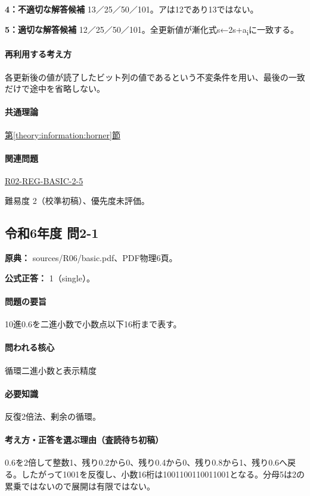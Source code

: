 \noindent\textbf{4：不適切な解答候補} 13／25／50／101。アは12であり13ではない。\par

\noindent\textbf{5：適切な解答候補} 12／25／50／101。全更新値が漸化式s←2s+a\textsubscript{i}に一致する。\par

\paragraph{再利用する考え方} 各更新後の値が読了したビット列の値であるという不変条件を用い、最後の一致だけで途中を省略しない。

\paragraph{共通理論} \hyperref[theory:information:horner]{第\ref*{theory:information:horner}節}

\paragraph{関連問題} \hyperref[q:r02-reg-basic-2-5]{R02-REG-BASIC-2-5}

\par 難易度 2（校準初稿）、優先度未評価。

\subsection{令和6年度 問2-1}
\label{q:r06-reg-basic-2-1}

\noindent\textbf{原典：} sources/R06/basic.pdf、PDF物理6頁。

\textbf{公式正答：} 1（single）。

\paragraph{問題の要旨} 10進0.6を二進小数で小数点以下16桁まで表す。

\paragraph{問われる核心} 循環二進小数と表示精度

\paragraph{必要知識} 反復2倍法、剰余の循環。

\paragraph{考え方・正答を選ぶ理由（査読待ち初稿）} 0.6を2倍して整数1、残り0.2から0、残り0.4から0、残り0.8から1、残り0.6へ戻る。したがって1001を反復し、小数16桁は1001100110011001となる。分母5は2の累乗ではないので展開は有限ではない。

